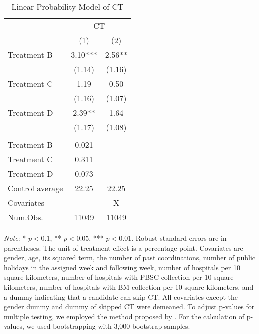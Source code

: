 \documentclass[12pt, a4paper]{article}
\begin{document}
\begin{table}

\caption{\label{tab:lm-test}Linear Probability Model of CT}
\centering
\fontsize{8}{10}\selectfont
\begin{threeparttable}
\begin{tabular}[t]{>{\raggedright\arraybackslash}p{20em}cc}
\toprule
\multicolumn{1}{c}{ } & \multicolumn{2}{c}{CT} \\
\cmidrule(l{3pt}r{3pt}){2-3}
  & (1) & (2)\\
\midrule
Treatment B & \num{3.10}*** & \num{2.56}**\\
 & (\num{1.14}) & (\num{1.16})\\
Treatment C & \num{1.19} & \num{0.50}\\
 & (\num{1.16}) & (\num{1.07})\\
Treatment D & \num{2.39}** & \num{1.64}\\
 & (\num{1.17}) & (\num{1.08})\\
\midrule
\addlinespace[0.3em]
\multicolumn{3}{l}{\textit{Adjustment of p-values for Multiple Testing}}\\
\hspace{1em}Treatment B & 0.021 & \\
\hspace{1em}Treatment C & 0.311 & \\
\hspace{1em}Treatment D & 0.073 & \\
Control average & 22.25 & 22.25\\
Covariates &  & X\\
Num.Obs. & \num{11049} & \num{11049}\\
\bottomrule
\end{tabular}
\begin{tablenotes}
\item \emph{Note}: * $p < 0.1$, ** $p < 0.05$, *** $p < 0.01$. Robust standard errors are in parentheses. The unit of treatment effect is a percentage point. Covariates are gender, age, its squared term, the number of past coordinations, number of public holidays in the assigned week and following week, number of hospitals per 10 square kilometers, number of hospitals with PBSC collection per 10 square kilometers, number of hospitals with BM collection per 10 square kilometers, and a dummy indicating that a candidate can skip CT. All covariates except the gender dummy and dummy of skipped CT were demeaned. To adjust p-values for multiple testing, we employed the method proposed by \citet{List2019}. For the calculation of p-values, we used bootstrapping with 3,000 bootstrap samples.
\end{tablenotes}
\end{threeparttable}
\end{table}
\end{document}
